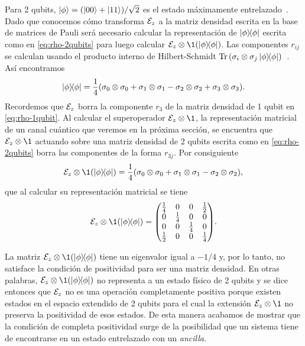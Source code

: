 Para 2 qubits, $\ket{\phi}=\qty(\ket{00}+\ket{11})/\sqrt{2}$ es el
estado máximamente entrelazado~\cite{bengtsson_zyczkowski_2017}.
Dado que conocemos cómo transforma $\mathcal{E}_z$ a la matriz densidad 
escrita en la base de matrices de Pauli será necesario calcular 
la representación de $\dyad{\phi}{\phi}$ escrita como en \eqref{eq:rho-2qubits}
para luego calcular $\E_z\ot \1(\dyad{\phi}{\phi})$.
Las componentes $r_{ij}$ se calculan usando el producto interno
de Hilbert-Schmidt $\Tr\qty(\pauli{i}{j}\dyad{\phi}{\phi})$~\cite{bengtsson_zyczkowski_2017}.
Así encontramos 
\begin{align}
\dyad{\phi}{\phi}=\frac{1}{4}\qty(
\pauli{0}{0}+\pauli{1}{1}-\pauli{2}{2}+\pauli{3}{3}).
\end{align}
Recordemos que $\mathcal{E}_z$ borra la componente $r_3$ de la
matriz densidad de 1 qubit en \eqref{eq:rho-1qubit}. 
Al calcular el superoperador $\E_z\ot  \1$, la representación matricial de 
un canal cuántico que veremos en la próxima sección, se encuentra
que $\E_z\otimes\1$ actuando sobre una matriz densidad de 2 qubits
escrita como en \eqref{eq:rho-2qubits} borra
las componentes de la forma $r_{3j}$. Por consiguiente
\begin{align}
\E_z\otimes\1 \qty(\dyad{\phi}{\phi})=\frac{1}{4}\qty(
\pauli{0}{0}+\pauli{1}{1}-\pauli{2}{2}),
\end{align}
que al calcular su representación matricial se tiene
\begin{align}
\E_z\otimes\1 \qty(\dyad{\phi}{\phi})=
\mqty( 
\frac{1}{4} & 0 & 0 & \frac{1}{2} \\
0 & \frac{1}{4} & 0 & 0 \\
0 & 0 & \frac{1}{4} & 0 \\
\frac{1}{2} & 0 & 0 & \frac{1}{4} \\
).
\end{align}

La matriz  $\E_z\otimes\1\qty(\dyad{\phi}{\phi})$ tiene un 
eigenvalor igual a $-1/4$ y, por lo tanto, no satisface la condición 
de positividad para ser una matriz densidad.  
En otras palabras, $\E_z\otimes\1\qty(\dyad{\phi}{\phi})$ 
no representa a un estado físico de 2 qubits y 
se dice entonces que $\mathcal{E}_z$ no es una operación completamente 
positiva porque existen estados en el espacio extendido de 2 qubits para 
el cual la extensión $\E_z\ot \1$ no preserva la positividad de esos estados. 
De esta manera acabamos de mostrar que la condición de completa
positividad surge de la posibilidad que un sistema tiene de encontrarse 
en un estado entrelazado con un \textit{ancilla}.

